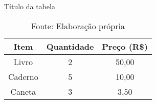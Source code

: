 \begin{table}[hbt!]
    \centering
    \caption{Título da tabela}
    \begin{tabular}{ccc}
        \hline
        \textbf{Item} & \textbf{Quantidade} & \textbf{Preço (R\$)} \\  
        \hline
        Livro        & 2       & 50,00  \\  
        Caderno      & 5       & 10,00  \\  
        Caneta       & 3       & 3,50   \\  
        \hline
    \end{tabular}
    \caption*{Fonte: Elaboração própria}
    \label{tab:exemplo}
\end{table}